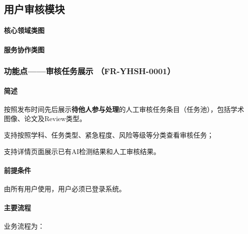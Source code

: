 \subsection{用户审核模块}

\paragraph*{核心领域类图}

\begin{center}
\resizebox{0.98\linewidth}{!}{}
\end{center}

\paragraph*{服务协作类图}

\begin{center}
\resizebox{0.98\linewidth}{!}{}
\end{center}

\subsubsection{功能点——审核任务展示 （FR-YHSH-0001）}

\paragraph*{简述}

按照发布时间先后展示\textbf{待他人参与处理}的人工审核任务条目（任务池），包括学术图像、论文及Review类型。

支持按照学科、任务类型、紧急程度、风险等级等分类查看审核任务；

支持详情页面展示已有AI检测结果和人工审核结果。

\paragraph*{前提条件}

由所有用户使用，用户必须已登录系统。

\paragraph*{主要流程}

业务流程为：

